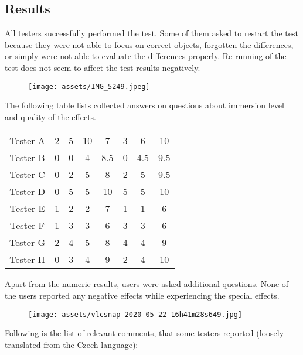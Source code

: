 \hypertarget{x-results}{\subsection{Results}}
All testers successfully performed the test. Some of them asked to
restart the test because they were not able to focus on correct objects,
forgotten the differences, or simply were not able to evaluate the
differences properly. Re-running of the test does not seem to affect the
test results negatively.


\begin{figure}[h]{}
\centering\texttt{[image: assets/IMG\_5249.jpeg]}
\caption{}

\end{figure}

The following table lists collected answers on questions about immersion level and
quality of the effects.


\begin{center}
\begin{tabular}{|c|c|c|c|c|c|c|c|}
\hline
Tester A & 2 & 5 & 10 & 7 & 3 & 6 & 10 \\ 
Tester B & 0 & 0 & 4 & 8.5 & 0 & 4.5 & 9.5 \\ 
Tester C & 0 & 2 & 5 & 8 & 2 & 5 & 9.5 \\ 
Tester D & 0 & 5 & 5 & 10 & 5 & 5 & 10 \\ 
Tester E & 1 & 2 & 2 & 7 & 1 & 1 & 6 \\ 
Tester F & 1 & 3 & 3 & 6 & 3 & 3 & 6 \\ 
Tester G & 2 & 4 & 5 & 8 & 4 & 4 & 9 \\ 
Tester H & 0 & 3 & 4 & 9 & 2 & 4 & 10 \\ 
\hline
\end{tabular}
\end{center}

Apart from the numeric results, users were asked additional questions.
None of the users reported any negative effects while experiencing the special
effects.


\begin{figure}[h]{}
\centering\texttt{[image: assets/vlcsnap-2020-05-22-16h41m28s649.jpg]}
\caption{}

\end{figure}

Following is the list of relevant comments, that some testers reported
(loosely translated from the Czech language):


